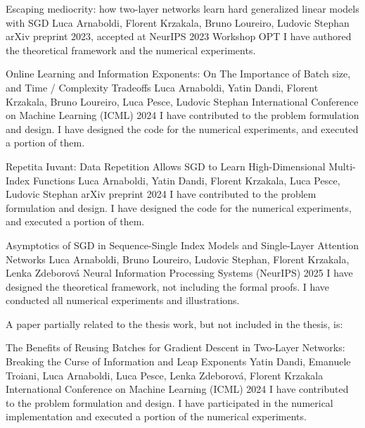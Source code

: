 \begin{contribution}
  {Escaping mediocrity: how two-layer networks learn hard generalized
   linear models with SGD}
  {Luca Arnaboldi, Florent Krzakala, Bruno Loureiro, Ludovic Stephan}
  {arXiv preprint 2023, accepted at NeurIPS 2023 Workshop OPT}
  {}
  I have authored the theoretical framework and the numerical experiments.
\end{contribution}

\begin{contribution}
  {Online Learning and Information Exponents: On The Importance of
   Batch size, and Time / Complexity Tradeoffs}
  {Luca Arnaboldi, Yatin Dandi, Florent Krzakala, Bruno Loureiro, Luca Pesce, Ludovic Stephan}
  {International Conference on Machine Learning (ICML) 2024}
  {}
  I have contributed to the problem formulation and design.
  I have designed the code for the numerical experiments, and executed a portion of them.
\end{contribution}

\begin{contribution}
  {Repetita Iuvant: Data Repetition Allows SGD to Learn
   High-Dimensional Multi-Index Functions}
  {Luca Arnaboldi, Yatin Dandi, Florent Krzakala, Luca Pesce, Ludovic Stephan}
  {arXiv preprint 2024}
  {}
  I have contributed to the problem formulation and design.
  I have designed the code for the numerical experiments, and executed a portion of them.
\end{contribution}

\begin{contribution}
  {Asymptotics of SGD in Sequence-Single Index Models and
   Single-Layer Attention Networks}
  {Luca Arnaboldi, Bruno Loureiro, Ludovic Stephan, Florent Krzakala, Lenka Zdeborov\'{a}}
  {Neural Information Processing Systems (NeurIPS) 2025}
  {}
  I have designed the theoretical framework, not including the formal proofs.
  I have conducted all numerical experiments and illustrations.
\end{contribution}

A paper partially related to the thesis work, but not included in the thesis, is:

\begin{contribution}
  {The Benefits of Reusing Batches for Gradient Descent in Two-Layer
   Networks: Breaking the Curse of Information and Leap Exponents}
  {Yatin Dandi, Emanuele Troiani, Luca Arnaboldi, Luca Pesce, Lenka Zdeborov\'{a}, Florent Krzakala}
  {International Conference on Machine Learning (ICML) 2024}
  {}
  I have contributed to the problem formulation and design.
  I have participated in the numerical implementation and executed a portion of the numerical experiments.
\end{contribution}

